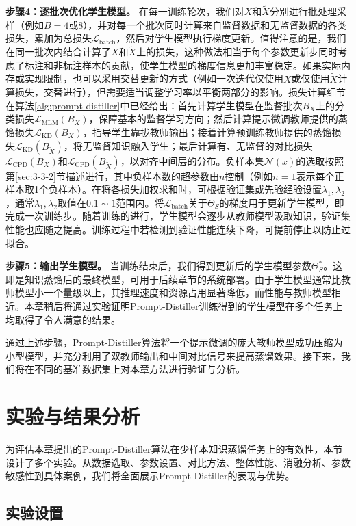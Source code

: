 \documentclass[../main.tex]{subfiles}
\begin{document}
\textbf{步骤4：逐批次优化学生模型。} 在每一训练轮次，我们对$X$和$\tilde{X}$分别进行批处理采样（例如$B=4$或8），并对每一个批次同时计算来自监督数据和无监督数据的各类损失，累加为总损失$\mathcal{L}_{\text{batch}}$，然后对学生模型执行梯度更新。值得注意的是，我们在同一批次内结合计算了$X$和$\tilde{X}$上的损失，这种做法相当于每个参数更新步同时考虑了标注和非标注样本的贡献，使学生模型的梯度信息更加丰富稳定。如果实际内存或实现限制，也可以采用交替更新的方式（例如一次迭代仅使用$X$或仅使用$\tilde{X}$计算损失，交替进行），但需要适当调整学习率以平衡两部分的影响。损失计算细节在算法\ref{alg:prompt-distiller}中已经给出：首先计算学生模型在监督批次$B_X$上的分类损失$\mathcal{L}_{\text{MLM}}(B_X)$，保障基本的监督学习方向；然后计算提示微调教师提供的蒸馏损失$\mathcal{L}_{\text{KD}}(B_X)$，指导学生靠拢教师输出；接着计算预训练教师提供的蒸馏损失$\mathcal{L}_{\text{KD}}(B_{\tilde{X}})$，将无监督知识融入学生；最后计算有、无监督的对比损失$\mathcal{L}_{\text{CPD}}(B_X)$和$\mathcal{L}_{\text{CPD}}(B_{\tilde{X}})$，以对齐中间层的分布。负样本集$\mathcal{N}(x)$的选取按照第\ref{sec:3-3-2}节描述进行，其中负样本数的超参数由$n$控制（例如$n=1$表示每个正样本取1个负样本）。在将各损失加权求和时，可根据验证集或先验经验设置$\lambda_1,\lambda_2$，通常$\lambda_1,\lambda_2$取值在$0.1\sim1$范围内。将$\mathcal{L}_{\text{batch}}$关于$\Theta_S$的梯度用于更新学生模型，即完成一次训练步。随着训练的进行，学生模型会逐步从教师模型汲取知识，验证集性能也应随之提高。训练过程中若检测到验证性能连续下降，可提前停止以防止过拟合。

\textbf{步骤5：输出学生模型。} 当训练结束后，我们得到更新后的学生模型参数$\Theta_S^*$。这即是知识蒸馏后的最终模型，可用于后续章节的系统部署。由于学生模型通常比教师模型小一个量级以上，其推理速度和资源占用显著降低，而性能与教师模型相近。本章稍后将通过实验证明Prompt-Distiller训练得到的学生模型在多个任务上均取得了令人满意的结果。

通过上述步骤，Prompt-Distiller算法将一个提示微调的庞大教师模型成功压缩为小型模型，并充分利用了双教师输出和中间对比信号来提高蒸馏效果。接下来，我们将在不同的基准数据集上对本章方法进行验证与分析。

\section{实验与结果分析}
\label{sec:3-5}
为评估本章提出的Prompt-Distiller算法在少样本知识蒸馏任务上的有效性，本节设计了多个实验。从数据选取、参数设置、对比方法、整体性能、消融分析、参数敏感性到具体案例，我们将全面展示Prompt-Distiller的表现与优势。

\subsection{实验设置}
\label{sec:3-5-1}
\end{document}

